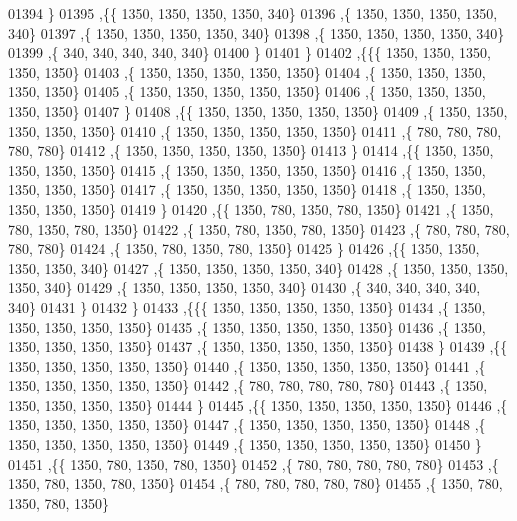 \begin{DoxyCode}
01394    \}
01395   ,\{\{  1350,  1350,  1350,  1350,   340\}
01396    ,\{  1350,  1350,  1350,  1350,   340\}
01397    ,\{  1350,  1350,  1350,  1350,   340\}
01398    ,\{  1350,  1350,  1350,  1350,   340\}
01399    ,\{   340,   340,   340,   340,   340\}
01400    \}
01401   \}
01402  ,\{\{\{  1350,  1350,  1350,  1350,  1350\}
01403    ,\{  1350,  1350,  1350,  1350,  1350\}
01404    ,\{  1350,  1350,  1350,  1350,  1350\}
01405    ,\{  1350,  1350,  1350,  1350,  1350\}
01406    ,\{  1350,  1350,  1350,  1350,  1350\}
01407    \}
01408   ,\{\{  1350,  1350,  1350,  1350,  1350\}
01409    ,\{  1350,  1350,  1350,  1350,  1350\}
01410    ,\{  1350,  1350,  1350,  1350,  1350\}
01411    ,\{   780,   780,   780,   780,   780\}
01412    ,\{  1350,  1350,  1350,  1350,  1350\}
01413    \}
01414   ,\{\{  1350,  1350,  1350,  1350,  1350\}
01415    ,\{  1350,  1350,  1350,  1350,  1350\}
01416    ,\{  1350,  1350,  1350,  1350,  1350\}
01417    ,\{  1350,  1350,  1350,  1350,  1350\}
01418    ,\{  1350,  1350,  1350,  1350,  1350\}
01419    \}
01420   ,\{\{  1350,   780,  1350,   780,  1350\}
01421    ,\{  1350,   780,  1350,   780,  1350\}
01422    ,\{  1350,   780,  1350,   780,  1350\}
01423    ,\{   780,   780,   780,   780,   780\}
01424    ,\{  1350,   780,  1350,   780,  1350\}
01425    \}
01426   ,\{\{  1350,  1350,  1350,  1350,   340\}
01427    ,\{  1350,  1350,  1350,  1350,   340\}
01428    ,\{  1350,  1350,  1350,  1350,   340\}
01429    ,\{  1350,  1350,  1350,  1350,   340\}
01430    ,\{   340,   340,   340,   340,   340\}
01431    \}
01432   \}
01433  ,\{\{\{  1350,  1350,  1350,  1350,  1350\}
01434    ,\{  1350,  1350,  1350,  1350,  1350\}
01435    ,\{  1350,  1350,  1350,  1350,  1350\}
01436    ,\{  1350,  1350,  1350,  1350,  1350\}
01437    ,\{  1350,  1350,  1350,  1350,  1350\}
01438    \}
01439   ,\{\{  1350,  1350,  1350,  1350,  1350\}
01440    ,\{  1350,  1350,  1350,  1350,  1350\}
01441    ,\{  1350,  1350,  1350,  1350,  1350\}
01442    ,\{   780,   780,   780,   780,   780\}
01443    ,\{  1350,  1350,  1350,  1350,  1350\}
01444    \}
01445   ,\{\{  1350,  1350,  1350,  1350,  1350\}
01446    ,\{  1350,  1350,  1350,  1350,  1350\}
01447    ,\{  1350,  1350,  1350,  1350,  1350\}
01448    ,\{  1350,  1350,  1350,  1350,  1350\}
01449    ,\{  1350,  1350,  1350,  1350,  1350\}
01450    \}
01451   ,\{\{  1350,   780,  1350,   780,  1350\}
01452    ,\{   780,   780,   780,   780,   780\}
01453    ,\{  1350,   780,  1350,   780,  1350\}
01454    ,\{   780,   780,   780,   780,   780\}
01455    ,\{  1350,   780,  1350,   780,  1350\}

\end{DoxyCode}
